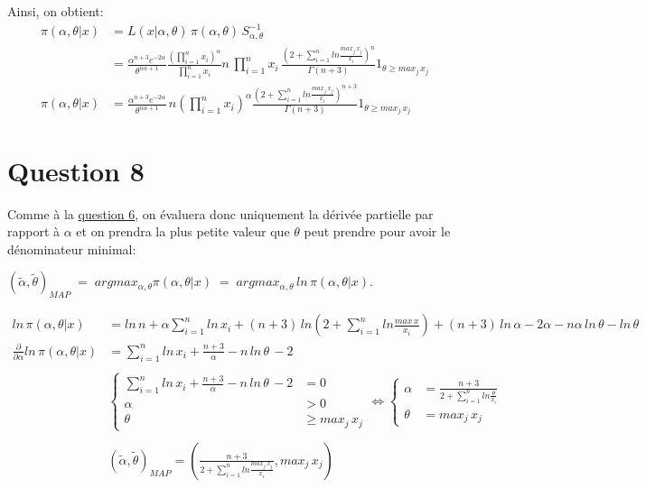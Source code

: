 \documentclass[
  12pt,
]{scrreprt}
\begin{document}
Ainsi, on obtient:
\[\begin{aligned}
\pi(\alpha,\theta|x) &= L(x|\alpha,\theta)\,\pi(\alpha,\theta)\,S_{\alpha,\theta}^{-1}\\
&=\frac{\alpha^{n+3}e^{-2\alpha}}{\theta^{n\alpha+1}} \frac{\left (\prod_{i=1}^n x_i\right )^\alpha}{\prod_{i=1}^n x_i}n\,\prod_{i=1}^n x_i\, \frac{\left(2+\sum_{i=1}^n ln \frac{max_j\,x_j}{x_i}  \right)^n}{\Gamma(n+3)}{1}_{\theta \geq max_j\,x_j}\\
\pi(\alpha,\theta|x) &=\frac{\alpha^{n+3}e^{-2\alpha}}{\theta^{n\alpha+1}}\, n\left (\prod_{i=1}^n x_i\right )^\alpha \frac{\left(2+\sum_{i=1}^n ln \frac{max_j\,x_j}{x_i}  \right)^{n+3}}{\Gamma(n+3)}{1}_{\theta \geq max_j\,x_j}
\end{aligned}\]

\hypertarget{question-8}{%
\section{Question 8}\label{question-8}}

Comme à la \protect\hyperlink{ux5cux23ux5cux2520Questionux5cux25206}{question 6}, on évaluera donc uniquement la dérivée partielle par rapport à \(\alpha\) et on prendra la plus petite valeur que \(\theta\) peut prendre pour avoir le dénominateur minimal:

\((\tilde{\alpha},\tilde{\theta})_{MAP}\; = \;argmax_{\alpha,\theta} \pi(\alpha,\theta|x)\; = \;argmax_{\alpha,\theta}\,ln\,\pi(\alpha,\theta|x)\).

\[\begin{aligned}
ln\,\pi(\alpha,\theta|x)&=ln\,n + \alpha\sum_{i=1}^n ln\,x_i + (n+3)\,ln\left ( 2+\sum_{i=1}^n ln\frac{max\,x}{x_i}\right ) +(n+3)\,ln\,\alpha -2\alpha-n\alpha\,ln\,\theta - ln\,\theta\\
\frac{\partial}{\partial\alpha}ln\,\pi(\alpha,\theta|x)&= \sum_{i=1}^n ln\,x_i + \frac{n+3}{\alpha} - n\,ln\,\theta\,-2\\
&\\
&\begin{cases}
\sum_{i=1}^n ln\,x_i + \frac{n+3}{\alpha} - n\,ln\,\theta\,-2 &= 0\\
\alpha &> 0\\
\theta &\geq max_j\,x_j
\end{cases}\Leftrightarrow
\begin{cases}
\alpha &= \frac{n+3}{2+\sum_{i=1}^n ln \frac{\theta}{x_i}}\\
\theta &= max_j\,x_j
\end{cases}
&\\
&\\
&(\tilde{\alpha},\tilde{\theta})_{MAP} = \left (\frac{n+3}{2+\sum_{i=1}^n ln \frac{max_j\,x_j}{x_i}}, max_j\,x_j\right)
\end{aligned}\]
\end{document}

